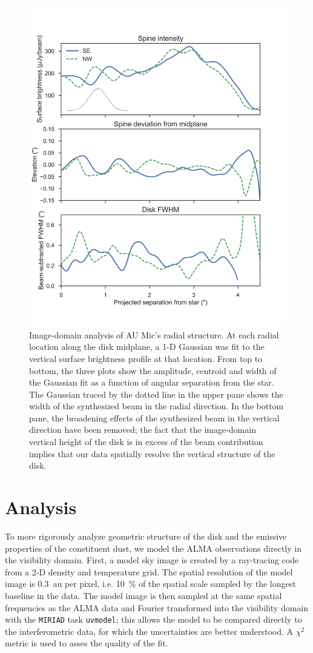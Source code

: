 \documentclass[12pt,oneside]{book}
\begin{document}
\begin{figure}
  \centering
  \includegraphics[width=.75\linewidth]{figures/3_boccaletti_plots}
  \caption{
  Image-domain analysis of AU Mic's radial structure. 
  At each radial location along the disk midplane, a 1-D Gaussian was fit to the vertical surface brightness profile at that location.
  From top to bottom, the three plots show the amplitude, centroid and width of the Gaussian fit as a function of angular separation from the star. 
  The Gaussian traced by the dotted line in the upper pane shows the width of the  synthesized beam in the radial direction.
  In the bottom pane, the broadening effects of the synthesized beam in the vertical direction have been removed; the fact that the image-domain vertical height of the disk is in excess of the beam contribution implies that our data spatially resolve the vertical structure of the disk.} 
  \label{fig: boccaletti}
\end{figure}


\chapter{Analysis}
\label{chap: analysis}
To more rigorously analyze geometric structure of the disk and the emissive properties of the constituent dust, we model the ALMA observations directly in the visibility domain.
First, a model sky image is created by a ray-tracing code from a 2-D density and temperature grid. 
The spatial resolution of the model image is \SI{0.3}{au} per pixel, i.e. \SI{10}{\percent} of the spatial scale sampled by the longest baseline in the data.
The model image is then sampled at the same spatial frequencies as the ALMA data and Fourier transformed into the visibility domain with the \texttt{MIRIAD} task \texttt{uvmodel}; this allows the model to be compared directly to the interferometric data, for which the uncertainties are better understood.
A $\chi^2$ metric is used to asses the quality of the fit.
\end{document}
